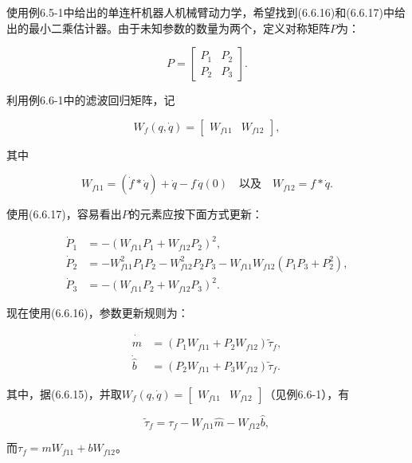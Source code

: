 \documentclass[12pt,a4paper]{ctexart}
\begin{document}
使用例6.5-1中给出的单连杆机器人机械臂动力学，希望找到(6.6.16)和(6.6.17)中给出的最小二乘估计器。由于未知参数的数量为两个，定义对称矩阵$P$为：

\begin{equation*}
P = \begin{bmatrix} P_1 & P_2 \\ P_2 & P_3 \end{bmatrix}.
\end{equation*}

利用例6.6-1中的滤波回归矩阵，记

\begin{equation*}
W_f(q,\dot{q}) = \begin{bmatrix} W_{f11} & W_{f12} \end{bmatrix},
\end{equation*}

其中

\begin{equation*}
W_{f11} = (\dot{f} * \dot{q}) + \dot{q} - f\, \dot{q}(0) \quad \text{以及} \quad W_{f12} = f * \dot{q}.
\end{equation*}

使用(6.6.17)，容易看出$P$的元素应按下面方式更新：

\begin{align*}
\dot{P}_1 &= -(W_{f11} P_1 + W_{f12} P_2)^2, \\
\dot{P}_2 &= -W_{f11}^2 P_1 P_2 - W_{f12}^2 P_2 P_3 - W_{f11} W_{f12}(P_1 P_3 + P_2^2), \\
\dot{P}_3 &= -(W_{f11} P_2 + W_{f12} P_3)^2.
\end{align*}

现在使用(6.6.16)，参数更新规则为：

\begin{align*}
\dot{\hat{m}} &= (P_1 W_{f11} + P_2 W_{f12}) \tilde{\tau}_f, \\
\dot{\hat{b}} &= (P_2 W_{f11} + P_3 W_{f12}) \tilde{\tau}_f.
\end{align*}

其中，据(6.6.15)，并取$W_f(q,\dot{q})=\begin{bmatrix} W_{f11} & W_{f12} \end{bmatrix}$（见例6.6-1），有

\begin{equation*}
\tilde{\tau}_f = \tau_f - W_{f11} \hat{m} - W_{f12} \hat{b},
\end{equation*}

而$\tau_f = m W_{f11} + b W_{f12}$。
\end{document}
